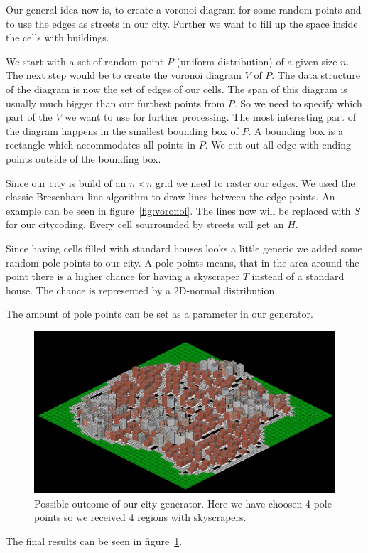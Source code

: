 \documentclass{scrartcl}
\begin{document}
Our general idea now is,  to create a voronoi diagram for some random points
and to use the edges as streets in our city. Further we want to fill up the
space inside the cells with buildings.

We  start with a set of random point $P$ (uniform distribution) of a given
size $n$. The next step would be to create the voronoi diagram $V$ of $P$.
The data structure of the diagram is now the set of edges of our cells.
The span of this diagram is usually much bigger than our furthest points from $P$.
So we need to specify which part of the $V$ we want to use for further processing.
The most interesting part of the diagram happens in the smallest bounding
box of $P$. A bounding box is a rectangle which
accommodates all points in $P$. We cut out all edge with ending points outside
of the bounding box.

Since our city is build of an $n\times n$ grid we need to raster our edges.
We used the classic Bresenham line algorithm to draw lines between the edge points.
An example can be seen in figure~\ref{fig:voronoi}.
The lines now will be replaced with $S$ for our citycoding. Every cell sourrounded
by streets will get an $H$.

Since having cells filled with standard houses looks a little
generic we added some random pole points to our city.
A pole points means, that in the area around the point there is a higher chance
for having a skyscraper $T$ instead of a standard house. The chance is represented
by a 2D-normal distribution.

The amount of pole points can be set as a parameter in our generator.

\begin{figure}
    \centering
    \includegraphics[scale = 1.2]{city1}
    \caption{Possible outcome of our city generator. Here we have choosen 4 pole
    points so we received 4 regions with skyscrapers.}
    \label{fig:city_example}
\end{figure}

The final results can be seen in figure~\ref{fig:city_example}.
\end{document}

